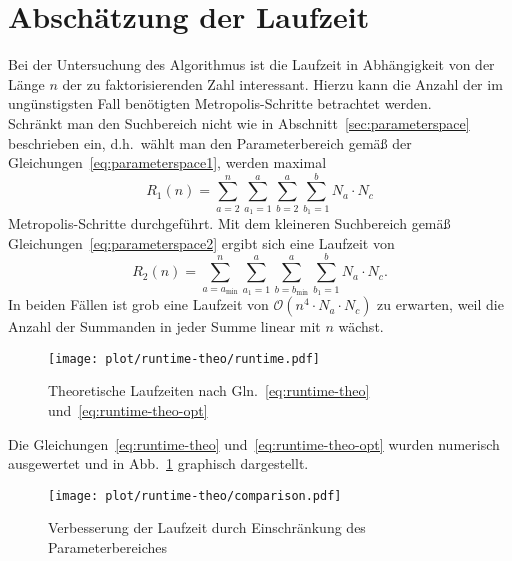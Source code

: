 

\FloatBarrier{}



\section{Abschätzung der Laufzeit}\label{sec:runtime-theo}
Bei der Untersuchung des Algorithmus ist die Laufzeit in Abhängigkeit von der Länge $n$ der zu faktorisierenden Zahl interessant. Hierzu kann die Anzahl der im ungünstigsten Fall benötigten Metropolis-Schritte betrachtet werden. \\
Schränkt man den Suchbereich nicht wie in Abschnitt~\ref{sec:parameterspace} beschrieben ein, d.h.\ wählt man den Parameterbereich gemäß der Gleichungen~\eqref{eq:parameterspace1}, werden maximal
\begin{equation}
		R_1\left(n\right)=\sum\limits_{a=2}^{n}\sum\limits_{a_1=1}^{a}\sum\limits_{b=2}^{a}\sum\limits_{b_1=1}^{b}N_a\cdot N_c\label{eq:runtime-theo}
\end{equation}
Metropolis-Schritte durchgeführt. Mit dem kleineren Suchbereich gemäß Gleichungen~\eqref{eq:parameterspace2} ergibt sich eine Laufzeit von
\begin{equation}
		R_2\left(n\right)=\sum\limits_{a=a_\mathrm{\min}}^{n}\sum\limits_{a_1=1}^{a}\sum\limits_{b=b_\mathrm{\min}}^{a}\sum\limits_{b_1=1}^{b}N_a\cdot N_c\label{eq:runtime-theo-opt}.
\end{equation}
In beiden Fällen ist grob eine Laufzeit von $\mathcal{O}\left(n^4\cdot N_a\cdot N_c\right)$ zu erwarten, weil die Anzahl der Summanden in jeder Summe linear mit $n$ wächst.

\begin{figure}[!ht]
		\centering
		\texttt{[image: plot/runtime-theo/runtime.pdf]}
		\caption{Theoretische Laufzeiten nach Gln.~\eqref{eq:runtime-theo} und~\eqref{eq:runtime-theo-opt}}\label{fig:runtime-theo}
\end{figure}

Die Gleichungen~\eqref{eq:runtime-theo} und~\eqref{eq:runtime-theo-opt} wurden numerisch ausgewertet und in Abb.~\ref{fig:runtime-theo} graphisch dargestellt.

\begin{figure}[!ht]
		\centering
		\texttt{[image: plot/runtime-theo/comparison.pdf]}
		\caption{Verbesserung der Laufzeit durch Einschränkung des Parameterbereiches}\label{fig:runtime-theo-comparison}
\end{figure}


